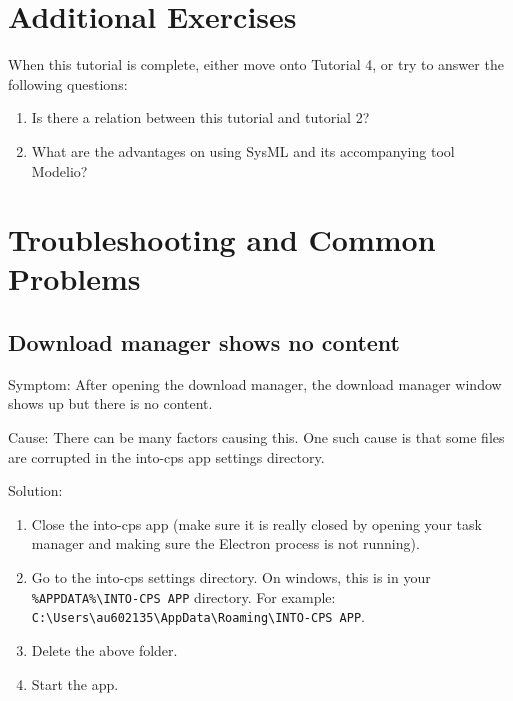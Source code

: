 \documentclass[11pt,a4paper]{../tutorial}
\begin{document}
\section{Additional Exercises}

When this tutorial is complete, either move onto Tutorial 4, or try to answer the following questions:

\begin{enumerate}
  \item Is there a relation between this tutorial and tutorial 2?
  \item What are the advantages on using SysML and its accompanying tool Modelio?
\end{enumerate}


\section{Troubleshooting and Common Problems}

\subsection{Download manager shows no content}

Symptom: After opening the download manager, the download manager window shows up but there is no content.

Cause: There can be many factors causing this. One such cause is that some files are corrupted in the into-cps app settings directory. 

Solution: 
\begin{enumerate}
	\item Close the into-cps app (make sure it is really closed by opening your task manager and making sure the Electron process is not running).
	\item Go to the into-cps settings directory. On windows, this is in your \verb=%APPDATA%\INTO-CPS APP= directory. For example: \verb=C:\Users\au602135\AppData\Roaming\INTO-CPS APP=.
	\item Delete the above folder.
	\item Start the app.
\end{enumerate}
\end{document}
